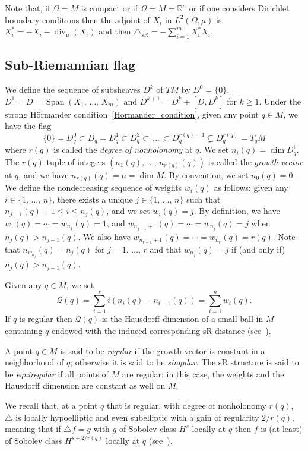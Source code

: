 \documentclass[AHL,Unicode,published]{cedram}
\newcommand*\R{\mathbb{R}}
\newcommand{\calQ}{\mathcal{Q}}
\DeclareMathOperator{\Span}{Span}
\DeclareMathOperator{\divl}{div}
\newcommand{\trianglesR}{\triangle_{\mathrm{sR}}}
\renewcommand{\geq}{\geqslant}
\renewcommand{\leq}{\leqslant}
\begin{document}
Note that, if $\Omega=M$ is compact or if $\Omega=M=\R^n$ or if one considers Dirichlet boundary conditions then the adjoint of $X_i$ in $L^2(\Omega,\mu)$ is $X_i^*=-X_i-\divl_\mu(X_i)$ and then $\trianglesR=-\sum_{i=1}^mX_i^*X_i$.



\subsection{Sub-Riemannian flag}\label{sec:sRflag}
We define the sequence of subsheaves $D^k$ of $TM$ by $D^0=\{0\}$, $D^1=D=\Span(X_1,\,\ldots,\,X_m)$ and $D^{k+1}=D^k+[D,D^k]$ for $k\geq 1$. Under the strong H\"ormander condition~\eqref{Hormander_condition}, given any point $q\in M$, we have the flag
\[
\{0\}=D^0_q\subset D_q=D^1_q\subset D^2_q\subset\,\ldots\,\subset D^{r(q)-1}_q\subsetneq D^{r(q)}_q=T_qM
\]
where $r(q)$ is called the \emph{degree of nonholonomy} at $q$. We set $n_i(q) = \dim D^i_q$. The $r(q)$-tuple of integers $(n_1(q),\,\ldots,\,n_{r(q)}(q))$ is called the \emph{growth vector} at $q$, and we have $n_{r(q)}(q)=n=\dim M$. By convention, we set $n_0(q)=0$. We define the nondecreasing sequence of weights $w_i(q)$ as follows: given any $i\in\{1,\,\ldots,\,n\}$, there exists a unique $j\in\{1,\,\ldots,\,n\}$ such that $n_{j-1}(q)+1\leq i\leq n_j(q)$, and we set $w_i(q)=j$. By definition, we have $w_1(q)=\cdots=w_{n_1}(q)=1$, and $w_{n_{j-1}+1}(q)=\cdots=w_{n_j}(q)=j$ when $n_j(q)>n_{j-1}(q)$. We also have $w_{n_{r-1}+1}(q)=\cdots=w_{n_r}(q)=r(q)$. Note that $n_{w_{n_j}}(q) = n_j(q)$ for $j=1,\,\ldots,\,r$ and that $w_{n_j}(q) = j$ if (and only if) $n_j(q)>n_{j-1}(q)$.

Given any $q\in M$, we set
\[
\calQ(q) = \sum_{i=1}^r i \left(n_i(q)-n_{i-1}(q)\right) =\sum_{i=1}^n w_i(q).
\]
If $q$ is regular then $\calQ(q)$ is the Hausdorff dimension of a small ball in $M$ containing $q$ endowed with the induced corresponding sR distance (see~\cite{Gromov}).

A point $q\in M$ is said to be \emph{regular} if the growth vector is constant in a neighborhood of $q$; otherwise it is said to be \emph{singular}. The sR structure is said to be \emph{equiregular} if all points of $M$ are regular; in this case, the weights and the Hausdorff dimension are constant as well on $M$.

We recall that, at a point $q$ that is regular, with degree of nonholonomy $r(q)$, $\triangle$ is locally hypoelliptic and even subelliptic with a gain of regularity $2/r(q)$, meaning that if $\triangle f=g$ with $g$ of Sobolev class $H^s$ locally at $q$ then $f$ is (at least) of Sobolev class $H^{s+2/r(q)}$ locally at $q$ (see~\cite{Ho-67}).
\end{document}
